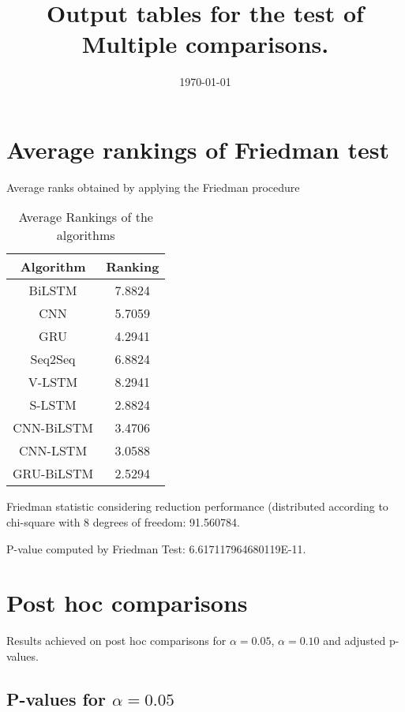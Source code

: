 \documentclass[a4paper,10pt]{article}
\title{Output tables for the test of Multiple comparisons.}
\author{}
\date{\today}
\begin{document}
\begin{landscape}
\pagestyle{empty}
\maketitle
\thispagestyle{empty}
\section{Average rankings of Friedman test}



Average ranks obtained by applying the Friedman procedure

\begin{table}[!htp]
\centering
\begin{tabular}{|c|c|}\hline
Algorithm&Ranking\\\hline
BiLSTM & 7.8824\\
CNN & 5.7059\\
GRU & 4.2941\\
Seq2Seq & 6.8824\\
V-LSTM & 8.2941\\
S-LSTM & 2.8824\\
CNN-BiLSTM & 3.4706\\
CNN-LSTM & 3.0588\\
GRU-BiLSTM & 2.5294\\
\hline
\end{tabular}
\caption{Average Rankings of the algorithms}
\end{table}

Friedman statistic considering reduction performance (distributed according to chi-square with 8 degrees of freedom: 91.560784.

P-value computed by Friedman Test: 6.617117964680119E-11.\newline



\pagebreak

\section{Post hoc comparisons}

Results achieved on post hoc comparisons for $\alpha = 0.05$, $\alpha = 0.10$ and adjusted p-values.

\subsection{P-values for $\alpha=0.05$}


\end{landscape}
\end{document}
